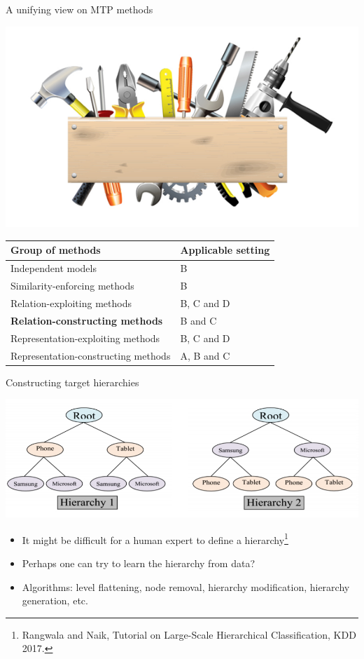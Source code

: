 \documentclass[]{beamer}
\renewcommand{\alert}[1]{\textbf{\color{putblue} #1}}
\begin{document}
\begin{frame}{A unifying view on MTP methods}

\begin{center}
\includegraphics[scale=0.3]{pics/tools}

\begin{tabular}{ll}
\hline
Group of methods & Applicable setting \\
\hline
\hline
Independent models & B \\
Similarity-enforcing methods & B   \\ 
Relation-exploiting methods & B, C and D  \\
\alert{Relation-constructing methods} & B and C \\
Representation-exploiting methods & B, C and D \\
Representation-constructing methods & A, B and C \\
\hline  
\end{tabular}
\end{center}
\end{frame}

\begin{frame}{Constructing target hierarchies}

\includegraphics[width=\textwidth]{pics/hierarchies}

\begin{itemize}
\item It might be difficult for a human expert to define a hierarchy\footnote{Rangwala and Naik, Tutorial on Large-Scale Hierarchical Classification, KDD 2017.}
\item Perhaps one can try to learn the hierarchy from data? 
\item Algorithms: level flattening, node removal, hierarchy modification, hierarchy generation, etc.
\end{itemize}


\end{frame}
\end{document}
